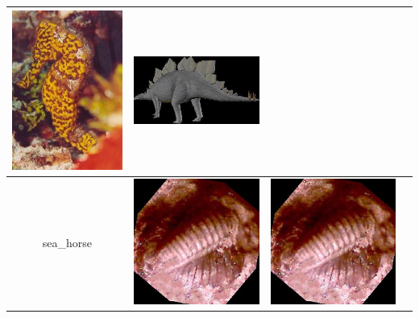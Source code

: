 \documentclass{article}
\begin{document}
\begin{table}[Ht]
\begin{tabular}{| c | c | c | c |}
\vspace{0cm}\includegraphics[scale=.1]{"Figures/False Matches/class_3_most_sure_wrong"} &
\vspace{0cm}\includegraphics[scale=.1]{"Figures/False Matches/class_3_least_sure_wrong"} \\
\hline
sea\_horse &
\vspace{0cm}\includegraphics[scale=.1]{"Figures/Best Matches/bestmatch_c4"} &
\vspace{0cm}\includegraphics[scale=.1]{"Figures/False Matches/class_4_most_sure_wrong"} &

\end{tabular}
\end{table}
\end{document}
